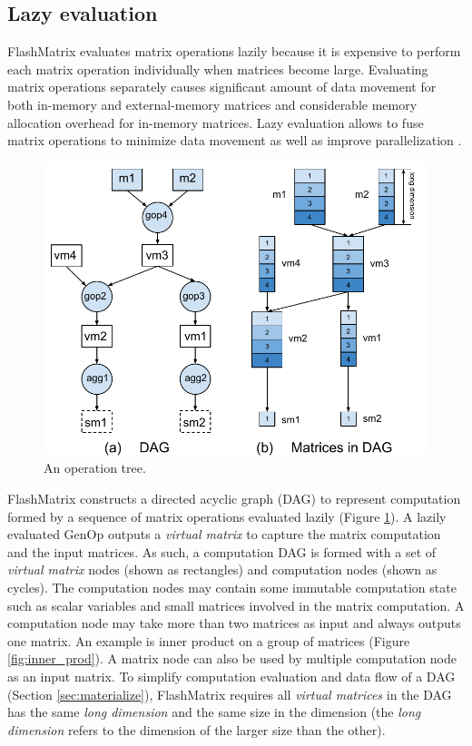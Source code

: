 \subsection{Lazy evaluation} \label{sec:lazy_eval}
FlashMatrix evaluates matrix operations lazily because it is expensive to
perform each matrix operation individually when matrices become large.
Evaluating matrix operations separately causes significant amount of data
movement for both in-memory and external-memory matrices and considerable
memory allocation overhead for in-memory matrices. Lazy evaluation allows
to fuse matrix operations to minimize data movement as well as improve
parallelization \cite{Ching12}.

\begin{figure}
	\centering
	\includegraphics[scale=0.5]{./DAG.pdf}
	\caption{An operation tree.}
	\label{fig:DAG}
\end{figure}

FlashMatrix constructs a directed acyclic graph (DAG) \cite{} to represent
computation formed by a sequence of matrix operations evaluated lazily
(Figure \ref{fig:DAG}). A lazily evaluated GenOp outputs a \textit{virtual matrix}
to capture the matrix computation and the input matrices. As such, a computation
DAG is formed with a set of \textit{virtual matrix} nodes (shown as rectangles)
and computation nodes (shown as cycles).
The computation nodes may contain some immutable computation state such as
scalar variables and small matrices involved in the matrix computation.
A computation node may take more than two matrices as input and always outputs
one matrix. An example is inner product on a group of matrices (Figure
\ref{fig:inner_prod}). A matrix node can also be used by multiple computation
node as an input matrix.
To simplify computation evaluation and data flow of a DAG (Section
\ref{sec:materialize}), FlashMatrix requires all \textit{virtual matrices} in
the DAG has the same \textit{long dimension} and the same size in the dimension
(the \textit{long dimension} refers to the dimension of the larger size than
the other).

